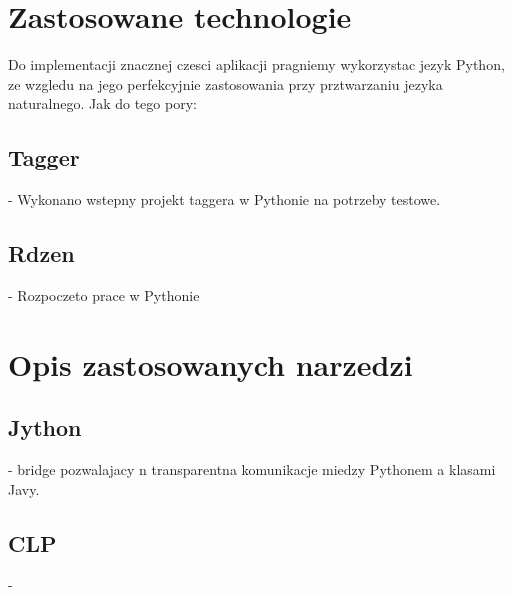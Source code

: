 \documentclass[12pt]{article}
\begin{document}
\section{Zastosowane technologie}
Do implementacji znacznej czesci aplikacji pragniemy wykorzystac jezyk Python, ze wzgledu na jego perfekcyjnie zastosowania przy prztwarzaniu jezyka naturalnego. Jak do tego pory:
\subsection {Tagger} - Wykonano wstepny projekt taggera w Pythonie na potrzeby testowe.
\subsection {Rdzen} - Rozpoczeto prace  w Pythonie
\section{Opis zastosowanych narzedzi}
\subsection{Jython} - bridge pozwalajacy n transparentna komunikacje miedzy Pythonem a klasami Javy.
\subsection{CLP} - 
\end{document}
